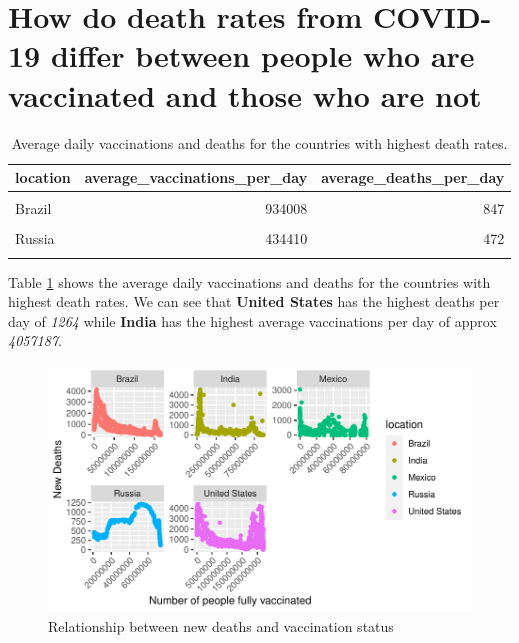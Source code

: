 \documentclass[11pt,a4paper,]{article}
\begin{document}
\clearpage

\section*{ How do death rates from COVID-19 differ between people who are vaccinated and those who are not}

\begin{table}[!h]

\caption{\label{tab:table}Average daily vaccinations and deaths for the countries with highest death rates.}
\centering
\begin{tabular}[t]{l|r|r}
\hline
location & average\_vaccinations\_per\_day & average\_deaths\_per\_day\\
\hline
\cellcolor{gray!6}{United States} & \cellcolor{gray!6}{1135290} & \cellcolor{gray!6}{1246}\\
\hline
Brazil & 934008 & 847\\
\hline
\cellcolor{gray!6}{India} & \cellcolor{gray!6}{4057187} & \cellcolor{gray!6}{657}\\
\hline
Russia & 434410 & 472\\
\hline
\cellcolor{gray!6}{Mexico} & \cellcolor{gray!6}{444551} & \cellcolor{gray!6}{407}\\
\hline
\end{tabular}
\end{table}

Table \ref{tab:table} shows the average daily vaccinations and deaths for the countries with highest death rates. We can see that \textbf{United States} has the highest deaths per day of \emph{1264} while \textbf{India} has the highest average vaccinations per day of approx \emph{4057187}.

\begin{figure}

{\centering \includegraphics{report_files/figure-latex/graph-1} 

}

\caption{Relationship between new deaths and vaccination status }\label{fig:graph}
\end{figure}
\end{document}
